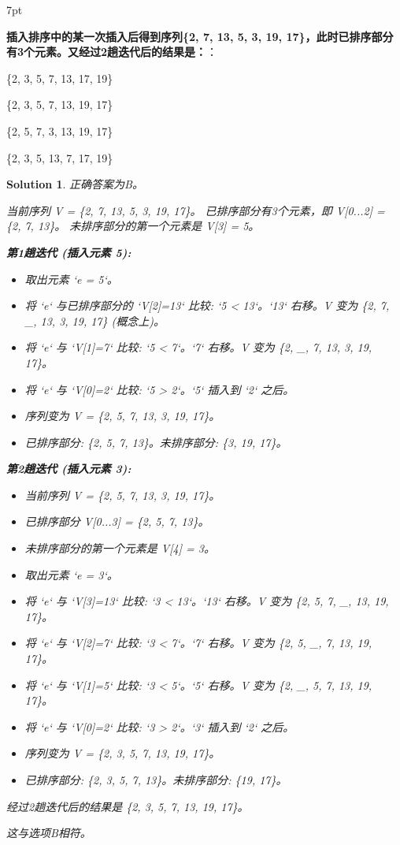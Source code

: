 \documentclass[UTF8]{report}
\newtheorem{solution}{Solution}
\theoremstyle{MyLineTheoremStyle} %
\theoremstyle{MyBlockTheoremStyle} %
\theoremstyle{MySubsubsectionStyle} %
\newenvironment{graybox}{%
        \def\FrameCommand{%
        \hspace{1pt}%
        {\color{gray}\small \vrule width 2pt}%
        {\color{graybox_color}\vrule width 4pt}%
        \colorbox{graybox_color}%
        }%
        \MakeFramed{\advance\hsize-\width\FrameRestore}%
        \noindent\hspace{-4.55pt}%
        \begin{adjustwidth}{}{7pt}%
        \vspace{2pt}\vspace{2pt}%
        }
        {%
        \vspace{2pt}\end{adjustwidth}\endMakeFramed%
        }
\begin{document}
\begin{graybox}
\textbf{插入排序中的某一次插入后得到序列\{2, 7, 13, 5, 3, 19, 17\}，此时已排序部分有3个元素。又经过2趟迭代后的结果是：}：
\begin{circledenum}
    \item \{2, 3, 5, 7, 13, 17, 19\}
    \item \{2, 3, 5, 7, 13, 19, 17\}
    \item \{2, 5, 7, 3, 13, 19, 17\}
    \item \{2, 3, 5, 13, 7, 17, 19\}
\end{circledenum}
\end{graybox}

\begin{solution}
正确答案为B。

当前序列 V = \{2, 7, 13, 5, 3, 19, 17\}。
已排序部分有3个元素，即 V[0...2] = \{2, 7, 13\}。
未排序部分的第一个元素是 V[3] = 5。

\textbf{第1趟迭代 (插入元素 5):}
\begin{itemize}
    \item 取出元素 `e = 5`。
    \item 将 `e` 与已排序部分的 `V[2]=13` 比较: `5 < 13`。`13` 右移。V 变为 \{2, 7, \_, 13, 3, 19, 17\} (概念上)。
    \item 将 `e` 与 `V[1]=7` 比较: `5 < 7`。`7` 右移。V 变为 \{2, \_, 7, 13, 3, 19, 17\}。
    \item 将 `e` 与 `V[0]=2` 比较: `5 > 2`。`5` 插入到 `2` 之后。
    \item 序列变为 V = \{2, 5, 7, 13, 3, 19, 17\}。
    \item 已排序部分: \{2, 5, 7, 13\}。未排序部分: \{3, 19, 17\}。
\end{itemize}

\textbf{第2趟迭代 (插入元素 3):}
\begin{itemize}
    \item 当前序列 V = \{2, 5, 7, 13, 3, 19, 17\}。
    \item 已排序部分 V[0...3] = \{2, 5, 7, 13\}。
    \item 未排序部分的第一个元素是 V[4] = 3。
    \item 取出元素 `e = 3`。
    \item 将 `e` 与 `V[3]=13` 比较: `3 < 13`。`13` 右移。V 变为 \{2, 5, 7, \_, 13, 19, 17\}。
    \item 将 `e` 与 `V[2]=7` 比较: `3 < 7`。`7` 右移。V 变为 \{2, 5, \_, 7, 13, 19, 17\}。
    \item 将 `e` 与 `V[1]=5` 比较: `3 < 5`。`5` 右移。V 变为 \{2, \_, 5, 7, 13, 19, 17\}。
    \item 将 `e` 与 `V[0]=2` 比较: `3 > 2`。`3` 插入到 `2` 之后。
    \item 序列变为 V = \{2, 3, 5, 7, 13, 19, 17\}。
    \item 已排序部分: \{2, 3, 5, 7, 13\}。未排序部分: \{19, 17\}。
\end{itemize}
经过2趟迭代后的结果是 \{2, 3, 5, 7, 13, 19, 17\}。

这与选项B相符。
\end{solution}
\end{document}
